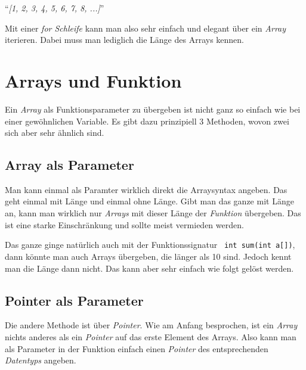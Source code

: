 \documentclass[c_worksheet.tex]{subfiles}
\begin{document}
\begin{center}
``\textit{[1, 2, 3, 4, 5, 6, 7, 8, ...]}'' 
\end{center}

Mit einer \emph{for Schleife} kann man also sehr einfach und elegant über ein \emph{Array} iterieren. Dabei muss man lediglich die Länge des Arrays kennen.


\section{Arrays und Funktion} 

Ein \emph{Array} als Funktionsparameter zu übergeben ist nicht ganz so einfach wie bei einer gewöhnlichen Variable. Es gibt dazu prinzipiell 3 Methoden, wovon zwei sich aber sehr ähnlich sind.

\subsection{Array als Parameter} 

Man kann einmal als Paramter wirklich direkt die Arraysyntax angeben. Das geht einmal mit Länge und einmal ohne Länge. Gibt man das ganze mit Länge an, kann man wirklich nur \emph{Arrays} mit dieser Länge der \emph{Funktion} übergeben. Das ist eine starke Einschränkung und sollte meist vermieden werden.



Das ganze ginge natürlich auch mit der Funktionssignatur \lstinline$ int sum(int a[])$, dann könnte man auch Arrays übergeben, die länger als 10 sind. Jedoch kennt man die Länge dann nicht. Das kann aber sehr einfach wie folgt gelöst werden.
 


\subsection{Pointer als Parameter}

Die andere Methode ist über \emph{Pointer}. Wie am Anfang besprochen, ist ein \emph{Array} nichts anderes als ein \emph{Pointer} auf das erste Element des Arrays. Also kann man als Parameter in der Funktion einfach einen \emph{Pointer} des entsprechenden \emph{Datentyps} angeben.

 
\end{document}
